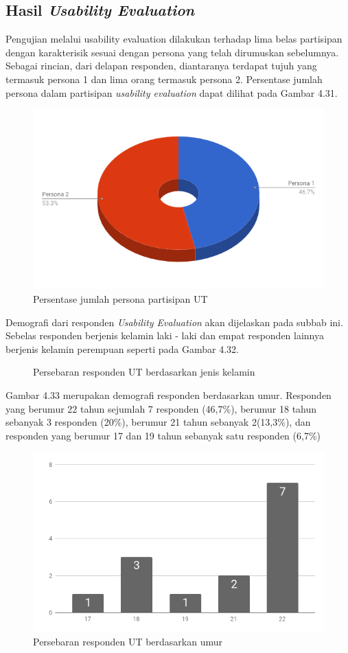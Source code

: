 	\subsection{Hasil \textit{Usability Evaluation}}
	Pengujian melalui usability evaluation dilakukan terhadap lima belas partisipan dengan karakterisik sesuai dengan persona yang telah dirumuskan sebelumnya. Sebagai rincian, dari delapan responden, diantaranya terdapat tujuh yang termasuk persona 1 dan lima orang termasuk persona 2. Persentase jumlah persona dalam partisipan \textit{usability evaluation} dapat dilihat pada Gambar 4.31.
	\begin{figure}
		\includegraphics[width=\linewidth]{pics/persentase-jumlah-persona}
		\caption{Persentase jumlah persona partisipan UT}
		\centering
	\end{figure}
	Demografi dari responden \textit{Usability Evaluation} akan dijelaskan pada subbab ini. Sebelas responden berjenis kelamin laki - laki dan empat responden lainnya berjenis kelamin perempuan seperti pada Gambar 4.32.
	\begin{figure}
		\caption{Persebaran responden UT berdasarkan jenis kelamin}
		\centering
	\end{figure}
	Gambar 4.33 merupakan demografi responden berdasarkan umur. Responden yang berumur 22 tahun sejumlah 7 responden (46,7\%), berumur 18 tahun sebanyak 3 responden (20\%), berumur 21 tahun sebanyak 2(13,3\%), dan responden yang berumur 17 dan 19 tahun sebanyak satu responden (6,7\%)
	\begin{figure}
		\includegraphics[width=\linewidth]{pics/UT/umur}
		\caption{Persebaran responden UT berdasarkan umur}
		\centering
	\end{figure}

